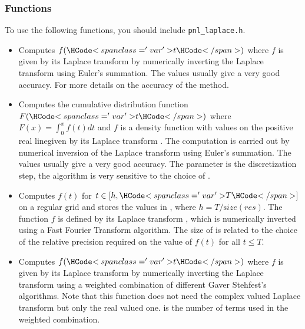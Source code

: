 \subsubsection{Functions}

To use the following functions, you should include \verb!pnl_laplace.h!.

\begin{itemize}
\item {}
  \sshortdescribe Computes $f(\var{t})$ where $f$ is given by its Laplace
  transform  by numerically inverting the Laplace transform using
  Euler's summation. The values  usually give a very good
  accuracy. For more details on the accuracy of the method.

\item {}
  \sshortdescribe Computes the cumulative distribution function $F(\var{t})$
  where $F(x) = \int_0^x f(t) dt$ and $f$ is a density function with values on
  the positive real linegiven by its Laplace transform . The
  computation is carried out by numerical inversion of the Laplace transform
  using Euler's summation. The values  usually give a very
  good accuracy. The parameter  is the discretization step, the
  algorithm is very sensitive to the choice of .

\item {}
  \sshortdescribe Computes $f(t)$ for $t \in [h, \var{T}]$ on a regular grid
  and stores the values in , where $h = T / {\mathrm size}(res)$. The
  function $f$ is defined by its Laplace transform , which is
  numerically inverted using a Fast Fourier Transform algorithm. The size of
   is related to the choice of the relative precision 
  required on the value of $f(t)$ for all $t \le T$.

\item {}
  \sshortdescribe Computes $f(\var{t})$ where $f$ is given by its Laplace
  transform  by numerically inverting the Laplace transform using a
  weighted combination of different Gaver Stehfest's algorithms. Note that
  this function does not need the complex valued Laplace transform but only the
  real valued one.  is the number of terms used in the weighted combination.


\end{itemize}
